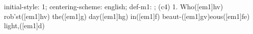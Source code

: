 initial-style: 1;
centering-scheme: english;
def-m1: \grealign;
(c4) 1. Who([em1]hv) rob'st([em1]hv) the([em1]g) day([em1]hg) in([em1]f) beaut-([em1]gv)eous([em1]fe) light,([em1]d)